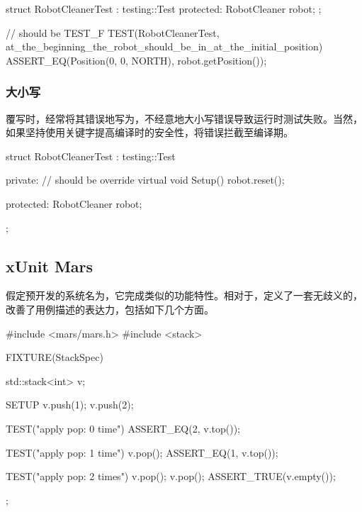 \begin{content}
\begin{leftbar}
 \begin{c++}
struct RobotCleanerTest : testing::Test {
protected:
  RobotCleaner robot;
};

// should be TEST\_F
TEST(RobotCleanerTest, at_the_beginning_the_robot_should_be_in_at_the_initial_position) {
  ASSERT_EQ(Position(0, 0, NORTH), robot.getPosition());
}
  \end{c++}
\end{leftbar}

\subsubsection{大小写}

覆写时，经常将其错误地写为，不经意地大小写错误导致运行时测试失败。当然，如果坚持使用关键字提高编译时的安全性，将错误拦截至编译期。

\begin{leftbar}
 \begin{c++}
struct RobotCleanerTest : testing::Test {
private:
  // should be override
  virtual void Setup() {
    robot.reset();
  }
 
protected:
  RobotCleaner robot;
};
  \end{c++}
\end{leftbar}

\subsection{xUnit Mars}

假定预开发的系统名为，它完成类似的功能特性。相对于，定义了一套无歧义的，改善了用例描述的表达力，包括如下几个方面。

\begin{enum}
\end{enum}

\begin{leftbar}
 \begin{c++}
#include <mars/mars.h>
#include <stack>

FIXTURE(StackSpec) {
  std::stack<int> v;   

  SETUP {
    v.push(1);
    v.push(2);
  }

  TEST("apply pop: 0 time") {
    ASSERT_EQ(2, v.top());
  }

  TEST("apply pop: 1 time") {
    v.pop();
    ASSERT_EQ(1, v.top());
  }

  TEST("apply pop: 2 times") {
    v.pop();
    v.pop();
    ASSERT_TRUE(v.empty());
  }
}; 
 \end{c++}
\end{leftbar}

\end{content}

